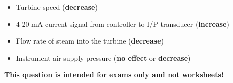 
\begin{itemize}
\item{} Turbine speed ({\bf decrease})
\vskip 10pt
\item{} 4-20 mA current signal from controller to I/P transducer ({\bf increase})
\vskip 10pt
\item{} Flow rate of steam into the turbine ({\bf decrease})
\vskip 10pt
\item{} Instrument air supply pressure ({\bf no effect} or {\bf decrease})
\end{itemize}








{\bf This question is intended for exams only and not worksheets!}



